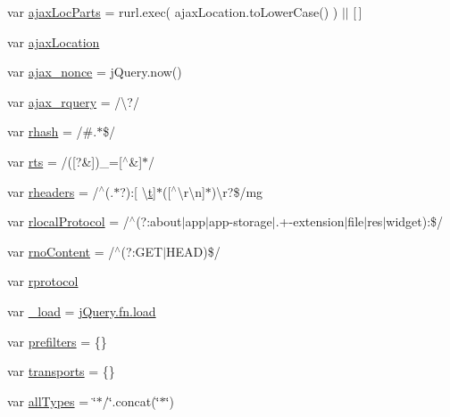 \begin{DoxyCompactItemize}
\item 
var \hyperlink{_scripts_2jquery-1_810_82_8js_a4c35110da3c335cfca38505ee65a5e79}{ajax\+Loc\+Parts} = rurl.\+exec( ajax\+Location.\+to\+Lower\+Case() ) $\vert$$\vert$ \mbox{[}$\,$\mbox{]}
\item 
var \hyperlink{_scripts_2jquery-1_810_82_8js_a1661d4e1676e7c6ffde5a3cb8d8ae246}{ajax\+Location}
\item 
var \hyperlink{_scripts_2jquery-1_810_82_8js_aaa43e6d4c76ee8be878dd7e93fb755a4}{ajax\+\_\+nonce} = j\+Query.\+now()
\item 
var \hyperlink{_scripts_2jquery-1_810_82_8js_a4da85c0011217bf1643139dc23999c5c}{ajax\+\_\+rquery} = /\textbackslash{}?/
\item 
var \hyperlink{_scripts_2jquery-1_810_82_8js_a6990b6955b6bec9dd39f3814cfb56d6d}{rhash} = /\#.$\ast$\$/
\item 
var \hyperlink{_scripts_2jquery-1_810_82_8js_a38ff30904f54277281a13514d7aea00d}{rts} = /(\mbox{[}?\&\mbox{]})\+\_\+=\mbox{[}$^\wedge$\&\mbox{]}$\ast$/
\item 
var \hyperlink{_scripts_2jquery-1_810_82_8js_af506d11612139f03091db71089d92e8b}{rheaders} = /$^\wedge$(.$\ast$?)\+:\mbox{[} \textbackslash{}\hyperlink{_scripts_2jquery_8validate_8min_8js_a23c5666e83bbbceee94adcd0851f50c4}{t}\mbox{]}$\ast$(\mbox{[}$^\wedge$\textbackslash{}r\textbackslash{}n\mbox{]}$\ast$)\textbackslash{}r?\$/mg
\item 
var \hyperlink{_scripts_2jquery-1_810_82_8js_af4dd13c90298bbf53ce08ec707dc9e2a}{rlocal\+Protocol} = /$^\wedge$(?\+:about$\vert$app$\vert$app-\/storage$\vert$.+-\/extension$\vert$file$\vert$res$\vert$widget)\+:\$/
\item 
var \hyperlink{_scripts_2jquery-1_810_82_8js_a537d744d72e31ec312aa3f16ef576d3f}{rno\+Content} = /$^\wedge$(?\+:G\+E\+T$\vert$H\+E\+A\+D)\$/
\item 
var \hyperlink{_scripts_2jquery-1_810_82_8js_a0f02b710647fcf95e74593954fb9b4cb}{rprotocol}
\item 
var \hyperlink{_scripts_2jquery-1_810_82_8js_ab9d9919a16b6ef96017991e55a3a9e6c}{\+\_\+load} = \hyperlink{_scripts_2jquery-1_810_82_8js_a8d0b9ec82c308161432f1c387d2fc2a7}{j\+Query.\+fn.\+load}
\item 
var \hyperlink{_scripts_2jquery-1_810_82_8js_a5682e57225039bc5b0c2e80654930080}{prefilters} = \{\}
\item 
var \hyperlink{_scripts_2jquery-1_810_82_8js_ae354ef69102eb621a6b2ef6c9fc4d6a3}{transports} = \{\}
\item 
var \hyperlink{_scripts_2jquery-1_810_82_8js_a2d6199559f6d1e840af674910a329b04}{all\+Types} = \char`\"{}$\ast$/\char`\"{}.concat(\char`\"{}$\ast$\char`\"{})
$$
\end{DoxyCompactItemize}

